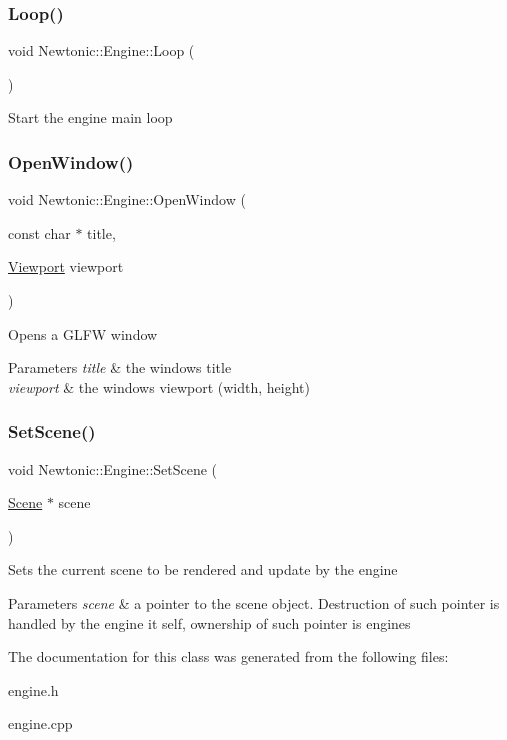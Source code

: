 \subsubsection{\texorpdfstring{Loop()}{Loop()}}
{\footnotesize\ttfamily void Newtonic\+::\+Engine\+::\+Loop (\begin{DoxyParamCaption}{ }\end{DoxyParamCaption})}

Start the engine main loop \mbox{\label{classNewtonic_1_1Engine_ad1b027c39bdd7a345a6132f649441bec}} 
\subsubsection{\texorpdfstring{OpenWindow()}{OpenWindow()}}
{\footnotesize\ttfamily void Newtonic\+::\+Engine\+::\+Open\+Window (\begin{DoxyParamCaption}\item[{const char $\ast$}]{title,  }\item[{\mbox{\hyperlink{structNewtonic_1_1Viewport}{Viewport}}}]{viewport }\end{DoxyParamCaption})}

Opens a G\+L\+FW window 
\begin{DoxyParams}{Parameters}
{\em title} & the window\textquotesingle{}s title \\
\hline
{\em viewport} & the window\textquotesingle{}s viewport (width, height) \\
\hline
\end{DoxyParams}
\mbox{\label{classNewtonic_1_1Engine_aa893883220d08fdc3c075f45446a628e}} 
\subsubsection{\texorpdfstring{SetScene()}{SetScene()}}
{\footnotesize\ttfamily void Newtonic\+::\+Engine\+::\+Set\+Scene (\begin{DoxyParamCaption}\item[{\mbox{\hyperlink{classNewtonic_1_1Scene}{Scene}} $\ast$}]{scene }\end{DoxyParamCaption})}

Sets the current scene to be rendered and update by the engine 
\begin{DoxyParams}{Parameters}
{\em scene} & a pointer to the scene object. Destruction of such pointer is handled by the engine it self, ownership of such pointer is engine\textquotesingle{}s \\
\hline
\end{DoxyParams}


The documentation for this class was generated from the following files\+:\begin{DoxyCompactItemize}
\item 
engine.\+h\item 
engine.\+cpp\end{DoxyCompactItemize}
